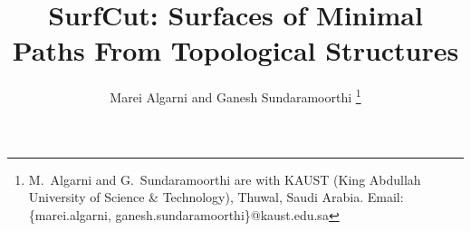 \documentclass[10pt,journal,compsoc]{IEEEtran}
\begin{document}
%
\title{SurfCut: Surfaces of Minimal Paths From Topological Structures}
%
%
%
%

\author{Marei Algarni and Ganesh Sundaramoorthi 
  \thanks{M.~Algarni and G.~Sundaramoorthi are with KAUST (King
    Abdullah University of Science \& Technology), Thuwal, Saudi
    Arabia. Email: \{marei.algarni, ganesh.sundaramoorthi\}@kaust.edu.sa } 
}

% 
%
\end{document}
